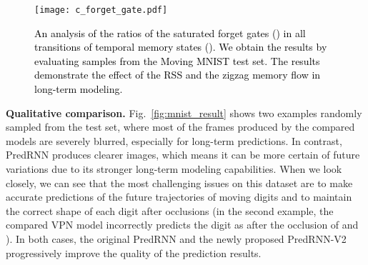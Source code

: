 \documentclass[10pt,journal,compsoc]{IEEEtran}
\newcommand{\fig}[1]{Fig.~\ref{#1}}
\newcommand{\revise}[1]{{\textcolor{black}{#1}}}
\newcommand{\myparagraph}[1]{\vspace{5pt} \noindent \textbf{#1.}}
\begin{document}
\begin{figure*}[t]
  \centering
  \hfil
  \vspace{-10pt}
\caption{
\revise{Gradient analyses on the Moving MNIST test set. We use well-trained models and average the results over  sequences randomly sampled from the test set. \textbf{(a)} It presents the gradients of previous states concerning the loss at the last forecasting timestep, showing that the proposed memory flow benefits long-term modeling by alleviating the vanishing gradients. \textbf{(b)} It presents the accumulated gradients of the encoding states concerning the losses over the forecasting timesteps, showing the importance of RSS in encoding long-term dynamics of the inputs. We here use the RSS training strategy with an exponentially increasing  (from \fig{fig:Strategy_2}). Both \textit{PredRNN} and \textit{PredRNN+RSS} take as input the historical real observations at encoding timesteps during testing.}
}
\label{fig:grad}
\vspace{-10pt}
\end{figure*}



\begin{figure}[t]
  \centering
  \texttt{[image: c\_forget\_gate.pdf]}
  \vskip -0.1in
  \caption{
\revise{An analysis of the ratios of the saturated forget gates () in all transitions of temporal memory states  (). We obtain the results by evaluating  samples from the Moving MNIST test set. The results demonstrate the effect of the RSS and the zigzag memory flow in long-term modeling.}
  }
  \label{fig:c_m_gate}
  \vspace{-10pt}
\end{figure}



\myparagraph{Qualitative comparison} 
\fig{fig:mnist_result} shows two examples randomly sampled from the test set, where most of the frames produced by the compared models are severely blurred, especially for long-term predictions. 
In contrast, PredRNN produces clearer images, which means it can be more certain of future variations due to its stronger long-term modeling capabilities.
When we look closely, we can see that the most challenging issues on this dataset are to make accurate predictions of the future trajectories of moving digits and to maintain the correct shape of each digit after occlusions (in the second example, the compared VPN model incorrectly predicts the digit  as  after the occlusion of  and ).
In both cases, the original PredRNN and the newly proposed PredRNN-V2 progressively improve the quality of the prediction results.
\end{document}
